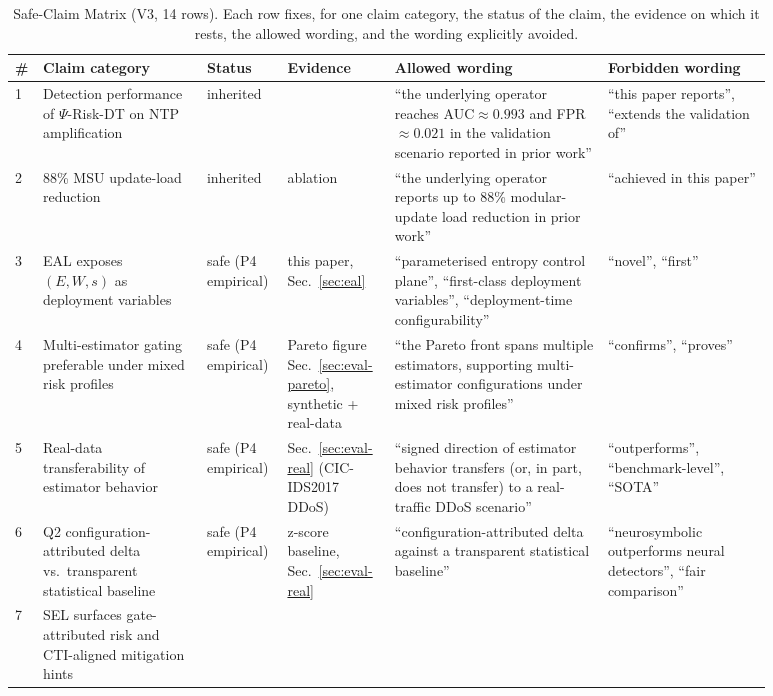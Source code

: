 \documentclass[futureinternet,article,submit,pdftex,moreauthors]{Definitions/mdpi}
\newcommand{\psiop}{\ensuremath{\Psi}}
\begin{document}
\begin{table}[t]
\centering
\caption{Safe-Claim Matrix (V3, 14 rows). Each row fixes, for one claim
category, the status of the claim, the evidence on which it rests, the
allowed wording, and the wording explicitly avoided.}
\label{tab:safe-claim}
\scriptsize
\begin{tabular}{@{}p{0.015\linewidth}p{0.20\linewidth}p{0.08\linewidth}p{0.13\linewidth}p{0.26\linewidth}p{0.20\linewidth}@{}}
\toprule
\textbf{\#} & \textbf{Claim category} & \textbf{Status}
  & \textbf{Evidence} & \textbf{Allowed wording}
  & \textbf{Forbidden wording} \\
\midrule
1 & Detection performance of $\psiop$-Risk-DT on NTP amplification
  & inherited & \cite{paper3}
  & ``the underlying operator reaches AUC$\approx 0.993$ and
    FPR$\approx 0.021$ in the validation scenario reported in prior
    work''
  & ``this paper reports'', ``extends the validation of'' \\
2 & 88\% MSU update-load reduction
  & inherited & \cite{paper3} ablation
  & ``the underlying operator reports up to 88\% modular-update load
    reduction in prior work''
  & ``achieved in this paper'' \\
3 & EAL exposes $(E, W, s)$ as deployment variables
  & safe (P4 empirical) & this paper, Sec.~\ref{sec:eal}
  & ``parameterised entropy control plane'', ``first-class deployment
    variables'', ``deployment-time configurability''
  & ``novel'', ``first'' \\
4 & Multi-estimator gating preferable under mixed risk profiles
  & safe (P4 empirical)
  & Pareto figure Sec.~\ref{sec:eval-pareto}, synthetic + real-data
  & ``the Pareto front spans multiple estimators, supporting
    multi-estimator configurations under mixed risk profiles''
  & ``confirms'', ``proves'' \\
5 & Real-data transferability of estimator behavior
  & safe (P4 empirical) & Sec.~\ref{sec:eval-real} (CIC-IDS2017 DDoS)
  & ``signed direction of estimator behavior transfers (or, in part,
    does not transfer) to a real-traffic DDoS scenario''
  & ``outperforms'', ``benchmark-level'', ``SOTA'' \\
6 & Q2 configuration-attributed delta vs.\ transparent statistical baseline
  & safe (P4 empirical) & z-score baseline, Sec.~\ref{sec:eval-real}
  & ``configuration-attributed delta against a transparent statistical
    baseline''
  & ``neurosymbolic outperforms neural detectors'', ``fair comparison'' \\
7 & SEL surfaces gate-attributed risk and CTI-aligned mitigation hints

\end{tabular}
\end{table}
\end{document}
